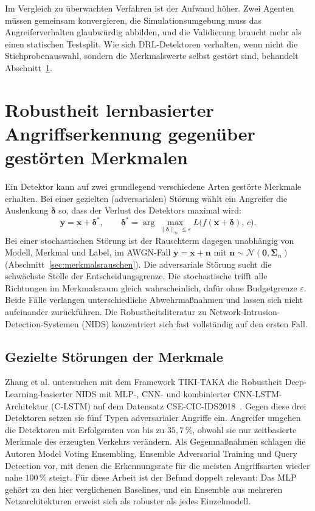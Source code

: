 Im Vergleich zu überwachten Verfahren ist der Aufwand höher. Zwei Agenten müssen gemeinsam konvergieren, die Simulationsumgebung muss das Angreiferverhalten glaubwürdig abbilden, und die Validierung braucht mehr als einen statischen Testsplit. Wie sich DRL-Detektoren verhalten, wenn nicht die Stichprobenauswahl, sondern die Merkmalswerte selbst gestört sind, behandelt Abschnitt~\ref{sec:rw_robustheit}.

\section{Robustheit lernbasierter Angriffserkennung gegenüber gestörten Merkmalen}
\label{sec:rw_robustheit}

Ein Detektor kann auf zwei grundlegend verschiedene Arten gestörte Merkmale erhalten. Bei einer gezielten (adversarialen) Störung wählt ein Angreifer die Auslenkung $\boldsymbol{\delta}$ so, dass der Verlust des Detektors maximal wird:
\begin{equation}
	\mathbf{y}=\mathbf{x}+\boldsymbol{\delta}^{*},\qquad \boldsymbol{\delta}^{*}=\arg\max_{\lVert\boldsymbol{\delta}\rVert_\infty\le\varepsilon} L\bigl(f(\mathbf{x}+\boldsymbol{\delta}),\,c\bigr).
\end{equation}
Bei einer stochastischen Störung ist der Rauschterm dagegen unabhängig von Modell, Merkmal und Label, im AWGN-Fall $\mathbf{y}=\mathbf{x}+\mathbf{n}$ mit $\mathbf{n}\sim\mathcal{N}(\mathbf{0},\boldsymbol{\Sigma}_n)$ (Abschnitt~\ref{sec:merkmalsrauschen}). Die adversariale Störung sucht die schwächste Stelle der Entscheidungsgrenze. Die stochastische trifft alle Richtungen im Merkmalsraum gleich wahrscheinlich, dafür ohne Budgetgrenze $\varepsilon$. Beide Fälle verlangen unterschiedliche Abwehrmaßnahmen und lassen sich nicht aufeinander zurückführen. Die Robustheitsliteratur zu Network-Intrusion-Detection-Systemen (NIDS) konzentriert sich fast vollständig auf den ersten Fall.

\subsection{Gezielte Störungen der Merkmale}

Zhang et al. untersuchen mit dem Framework TIKI-TAKA die Robustheit Deep-Learning-basierter NIDS mit MLP-, CNN- und kombinierter CNN-LSTM-Architektur (C-LSTM) auf dem Datensatz CSE-CIC-IDS2018~\autocite{zhangAdversarialAttacksDeep2022}. Gegen diese drei Detektoren setzen sie fünf Typen adversarialer Angriffe ein. Angreifer umgehen die Detektoren mit Erfolgsraten von bis zu $35{,}7\,\%$, obwohl sie nur zeitbasierte Merkmale des erzeugten Verkehrs verändern. Als Gegenmaßnahmen schlagen die Autoren Model Voting Ensembling, Ensemble Adversarial Training und Query Detection vor, mit denen die Erkennungsrate für die meisten Angriffsarten wieder nahe $100\,\%$ steigt. Für diese Arbeit ist der Befund doppelt relevant: Das MLP gehört zu den hier verglichenen Baselines, und ein Ensemble aus mehreren Netzarchitekturen erweist sich als robuster als jedes Einzelmodell.


